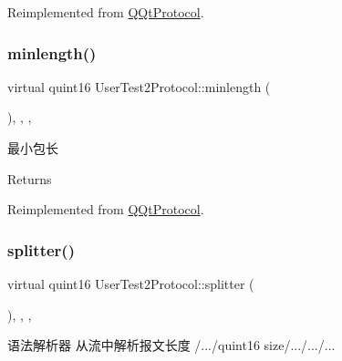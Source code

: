 Reimplemented from \mbox{\hyperlink{class_q_qt_protocol_af41bc3116abbbcfc9af45e151a253ff7}{Q\+Qt\+Protocol}}.

\mbox{\label{class_user_test2_protocol_a00f0df8afa902f5c351147f2f473906d}} 
\subsubsection{\texorpdfstring{minlength()}{minlength()}}
{\footnotesize\ttfamily virtual quint16 User\+Test2\+Protocol\+::minlength (\begin{DoxyParamCaption}{ }\end{DoxyParamCaption})\hspace{0.3cm}{\ttfamily [inline]}, {\ttfamily [override]}, {\ttfamily [protected]}, {\ttfamily [virtual]}}



最小包长 

\begin{DoxyReturn}{Returns}

\end{DoxyReturn}


Reimplemented from \mbox{\hyperlink{class_q_qt_protocol_a2b00f53d3dd0eed817eeecff422891f3}{Q\+Qt\+Protocol}}.

\mbox{\label{class_user_test2_protocol_a383a85b77478cb1a0857221ef12a3f6a}} 
\subsubsection{\texorpdfstring{splitter()}{splitter()}}
{\footnotesize\ttfamily virtual quint16 User\+Test2\+Protocol\+::splitter (\begin{DoxyParamCaption}\item[{const Q\+Byte\+Array \&}]{ }\end{DoxyParamCaption})\hspace{0.3cm}{\ttfamily [inline]}, {\ttfamily [override]}, {\ttfamily [protected]}, {\ttfamily [virtual]}}



语法解析器 从流中解析报文长度 /.../quint16 size/.../.../... 


